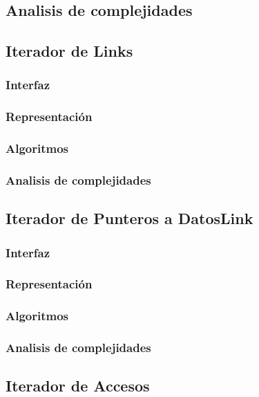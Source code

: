 \documentclass[12pt, a4paper]{article}
\begin{document}
\subsection{Analisis de complejidades}


\subsection{Iterador de Links} 
\subsubsection{Interfaz}

\subsubsection{Representaci\'on}

\subsubsection{Algoritmos}

\subsubsection{Analisis de complejidades}

 
\subsection{Iterador de Punteros a DatosLink} 
\subsubsection{Interfaz}

\subsubsection{Representaci\'on}

\subsubsection{Algoritmos}

\subsubsection{Analisis de complejidades}

 
\subsection{Iterador de Accesos} 
%
\end{document}
